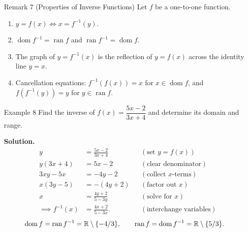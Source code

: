 \begin{remarkbox}{Remark 7 (Properties of Inverse Functions)}
Let \(f\) be a one-to-one function.
\begin{enumerate}
    \item \(y = f(x) \iff x = f^{-1}(y)\).
    \item \(\operatorname{dom} f^{-1} = \operatorname{ran} f\) and \(\operatorname{ran} f^{-1} = \operatorname{dom} f\).
    \item The graph of \(y = f^{-1}(x)\) is the reflection of \(y = f(x)\) across the identity line \(y = x\).
    \item Cancellation equations: \(f^{-1}(f(x)) = x\) for \(x \in \operatorname{dom} f\), and \(f(f^{-1}(y)) = y\) for \(y \in \operatorname{ran} f\).
\end{enumerate}
\end{remarkbox}

\begin{examplebox}{Example 8}
Find the inverse of \(f(x) = \dfrac{5x - 2}{3x + 4}\) and determine its domain and range.

\medskip
\textbf{Solution.}
\begin{align*}
y &= \frac{5x - 2}{3x + 4} && (\text{set } y = f(x)) \\[4pt]
y(3x + 4) &= 5x - 2 && (\text{clear denominator}) \\[4pt]
3xy - 5x &= -4y - 2 && (\text{collect } x\text{-terms}) \\[4pt]
x(3y - 5) &= -(4y + 2) && (\text{factor out } x) \\[4pt]
x &= \frac{4y + 2}{5 - 3y} && (\text{solve for } x) \\[4pt]
\implies f^{-1}(x) &= \frac{4x + 2}{5 - 3x}. && (\text{interchange variables})
\end{align*}
\begin{align*}
\operatorname{dom} f &= \operatorname{ran} f^{-1} = \mathbb{R} \setminus \{-4/3\}, \qquad \operatorname{ran} f = \operatorname{dom} f^{-1} = \mathbb{R} \setminus \{5/3\}.
\end{align*}
\end{examplebox}

